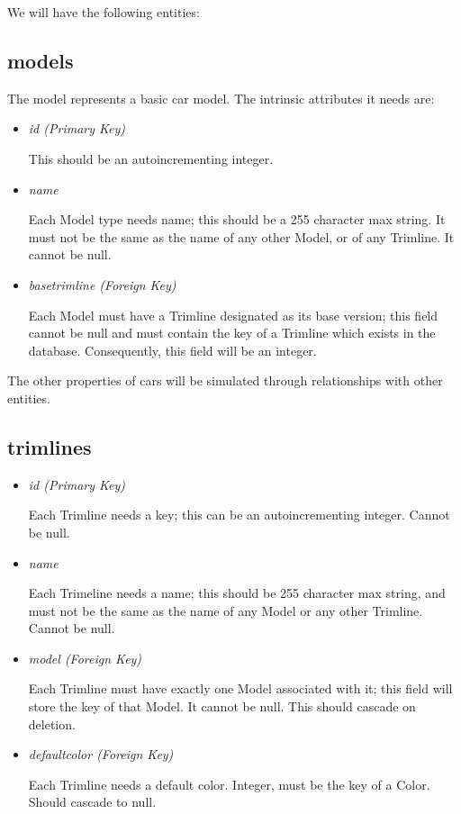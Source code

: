 \documentclass[11pt,letterpaper,oneside]{amsart}
\begin{document}
We will have the following entities:

\subsection*{models}
The model represents a basic car model.  The intrinsic attributes it needs are:
\begin{itemize}
	\item \emph{id (Primary Key)}
	
	This should be an autoincrementing integer.
	
	\item \emph{name}
	
	Each Model type needs name; this should be a 255 character max string.  It must not be the same as the name of any other Model, or of any Trimline.  It cannot be null.
	
	\item \emph{base{\textunderscore}trimline (Foreign Key)}
	
	Each Model must have a Trimline designated as its base version; this field cannot be null and must contain the key of a Trimline which exists in the database.  Consequently, this field will be an integer.
	
	
\end{itemize}

The other properties of cars will be simulated through relationships with other entities.

\subsection*{trimlines}

\begin{itemize}
	\item \emph{id (Primary Key)}
	
	Each Trimline needs a key; this can be an autoincrementing integer. Cannot be null.
	
	\item \emph{name}
	
	Each Trimeline needs a name; this should be 255 character max string, and must not be the same as the name of any Model or any other Trimline.  Cannot be null.

	\item \emph{model (Foreign Key)}
	
	Each Trimline must have exactly one Model associated with it; this field will store the key of that Model.  It cannot be null.  This should cascade on deletion.
	
	\item \emph{default{\textunderscore}color (Foreign Key)}
	
	Each Trimline needs a default color.  Integer, must be the key of a Color.  Should cascade to null.

\end{itemize}
\end{document}
